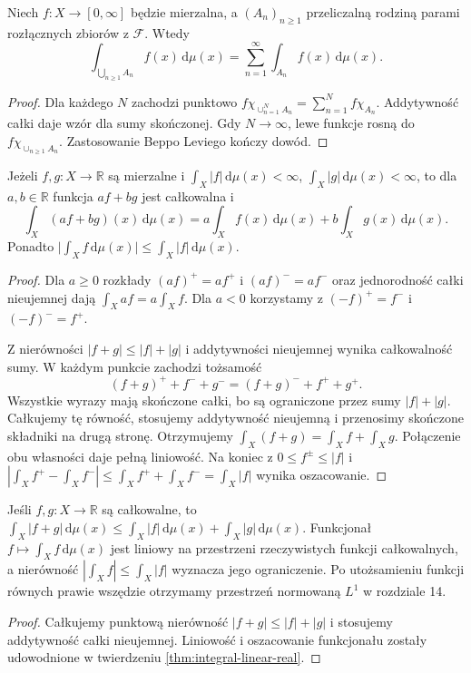 \begin{wniosek}
\label{cor:integral-countable-partition}
Niech $f:X\to[0,\infty]$ będzie mierzalna, a
$(A_n)_{n\ge1}$ przeliczalną rodziną parami rozłącznych
zbiorów z $\mathcal F$. Wtedy
\begin{equation}\label{eq:integral-partition}
\int_{\bigcup_{n\ge1}A_n}f(x)\,\mathrm d\mu(x)
=\sum_{n=1}^{\infty}\int_{A_n}f(x)\,\mathrm d\mu(x).
\end{equation}
\end{wniosek}
\begin{proof}
Dla każdego $N$ zachodzi punktowo
$f\chi_{\cup_{n=1}^NA_n}=
\sum_{n=1}^Nf\chi_{A_n}$.
Addytywność całki daje wzór dla sumy skończonej.
Gdy $N\to\infty$, lewe funkcje rosną do
$f\chi_{\cup_{n\ge1}A_n}$. Zastosowanie
Beppo Leviego kończy dowód.
\end{proof}

\begin{twierdzenie}
\label{thm:integral-linear-real}
Jeżeli $f,g:X\to\mathbb R$ są mierzalne i
$\int_X|f|\,\mathrm d\mu(x)<\infty$,
$\int_X|g|\,\mathrm d\mu(x)<\infty$, to dla
$a,b\in\mathbb R$ funkcja $af+bg$ jest całkowalna i
\[
\int_X(af+bg)(x)\,\mathrm d\mu(x)
=a\int_Xf(x)\,\mathrm d\mu(x)+
b\int_Xg(x)\,\mathrm d\mu(x).
\]
Ponadto $\bigl|\int_Xf\,\mathrm d\mu(x)\bigr|
\le\int_X|f|\,\mathrm d\mu(x)$.
\end{twierdzenie}
\begin{proof}
Dla $a\ge0$ rozkłady $(af)^+=af^+$ i
$(af)^-=af^-$ oraz jednorodność całki nieujemnej
dają $\int_X af=a\int_X f$. Dla $a<0$ korzystamy z
$(-f)^+=f^-$ i $(-f)^-=f^+$.

Z nierówności $|f+g|\le|f|+|g|$ i addytywności
nieujemnej wynika całkowalność sumy.
W każdym punkcie zachodzi tożsamość
\[
(f+g)^++f^-+g^-=(f+g)^-+f^++g^+.
\]
Wszystkie wyrazy mają skończone całki, bo są
ograniczone przez sumy $|f|+|g|$.
Całkujemy tę równość, stosujemy addytywność
nieujemną i przenosimy skończone składniki na
drugą stronę. Otrzymujemy
$\int_X(f+g)=\int_X f+\int_X g$.
Połączenie obu własności daje pełną liniowość.
Na koniec z $0\le f^\pm\le|f|$ i
$|\int_X f^+-\int_X f^-|\le\int_X f^++\int_X f^-
=\int_X|f|$ wynika oszacowanie.
\end{proof}

\begin{wniosek}
\label{cor:integral-triangle}
Jeśli $f,g:X\to\mathbb R$ są całkowalne, to
$\int_X|f+g|\,\mathrm d\mu(x)\le
\int_X|f|\,\mathrm d\mu(x)+
\int_X|g|\,\mathrm d\mu(x)$.
Funkcjonał $f\mapsto\int_Xf\,\mathrm d\mu(x)$
jest liniowy na przestrzeni rzeczywistych
funkcji całkowalnych, a nierówność
$|\int_X f|\le\int_X|f|$ wyznacza jego ograniczenie.
Po utożsamieniu funkcji równych prawie wszędzie
otrzymamy przestrzeń normowaną $L^1$ w rozdziale 14.
\end{wniosek}
\begin{proof}
Całkujemy punktową nierówność $|f+g|\le|f|+|g|$
i stosujemy addytywność całki nieujemnej. Liniowość
i oszacowanie funkcjonału zostały udowodnione
w twierdzeniu \ref{thm:integral-linear-real}.
\end{proof}


